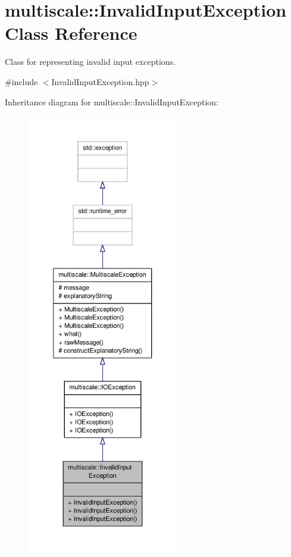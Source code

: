 \hypertarget{classmultiscale_1_1InvalidInputException}{\section{multiscale\-:\-:Invalid\-Input\-Exception Class Reference}
\label{classmultiscale_1_1InvalidInputException}
}


Class for representing invalid input exceptions.  




{\ttfamily \#include $<$Invalid\-Input\-Exception.\-hpp$>$}



Inheritance diagram for multiscale\-:\-:Invalid\-Input\-Exception\-:\nopagebreak
\begin{figure}[H]
\begin{center}
\leavevmode
\includegraphics[height=550pt]{classmultiscale_1_1InvalidInputException__inherit__graph}
\end{center}
\end{figure}


